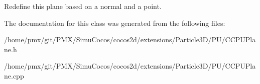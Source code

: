 Redefine this plane based on a normal and a point. 

The documentation for this class was generated from the following files\+:\begin{DoxyCompactItemize}
\item 
/home/pmx/git/\+P\+M\+X/\+Simu\+Cocos/cocos2d/extensions/\+Particle3\+D/\+P\+U/C\+C\+P\+U\+Plane.\+h\item 
/home/pmx/git/\+P\+M\+X/\+Simu\+Cocos/cocos2d/extensions/\+Particle3\+D/\+P\+U/C\+C\+P\+U\+Plane.\+cpp\end{DoxyCompactItemize}
